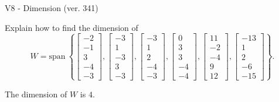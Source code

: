 \begin{exercise}
  \begin{exerciseTitle}V8 - Dimension (ver. 341)\end{exerciseTitle}
  \begin{exerciseStatement}
    Explain how to find the dimension of 
\[W=\mathrm{span}\ \left\{\left[\begin{array}{r}
-2 \\
-1 \\
3 \\
-4 \\
-3
\end{array}\right] , \left[\begin{array}{r}
-3 \\
1 \\
-3 \\
3 \\
-3
\end{array}\right] , \left[\begin{array}{r}
-3 \\
1 \\
2 \\
-4 \\
-3
\end{array}\right] , \left[\begin{array}{r}
0 \\
3 \\
3 \\
-4 \\
-4
\end{array}\right] , \left[\begin{array}{r}
11 \\
-2 \\
-4 \\
9 \\
12
\end{array}\right] , \left[\begin{array}{r}
-13 \\
1 \\
2 \\
-6 \\
-15
\end{array}\right]\right\}.\]



  \end{exerciseStatement}
  \begin{exerciseAnswer}
   The dimension of \(W\) is  \(4\).
  


  \end{exerciseAnswer}
\end{exercise}